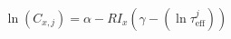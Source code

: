 \documentclass[a5paper]{article}
\begin{document}
\LARGE
\pagestyle{empty}
\[
\ln(C_{x,j}) = \alpha-RI_x\left(\gamma-(\ln \tau_\mathrm{eff}^j)\right)
\]
\end{document}

